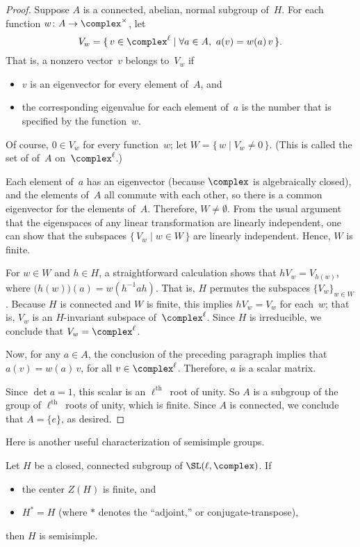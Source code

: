 \begin{proof}
 Suppose $A$ is a connected, abelian, normal subgroup
of~$H$. For each function $w \colon A \to \complex^\times$,
let 
 $$ V_w = \{\, v \in \complex^\ell \mid \forall a \in A, \
a(v) = w(a) \, v \,\} .$$
 That is, a nonzero vector~$v$ belongs to~$V_w$ if 
 \begin{itemize}
 \item $v$ is an eigenvector for every element of~$A$, and 
 \item the corresponding eigenvalue for each element of~$a$
is the number that is specified by the function~$w$.
 \end{itemize}
 Of course, $0 \in V_w$ for every function~$w$; let $W =
\{\, w \mid V_w \neq 0\,\}$. (This is called the set of
 of~$A$
on~$\complex^\ell$.)

Each element of~$a$ has an eigenvector (because $\complex$
is algebraically closed), and the elements of~$A$ all
commute with each other, so there is a common eigenvector
for the elements of~$A$. Therefore, $W \neq \emptyset$. From
the usual argument that the eigenspaces of any linear
transformation are linearly independent, one can show that
the subspaces $\{\,V_w \mid w \in W \,\}$ are linearly
independent. Hence, $W$ is finite.

For $w \in W$ and $h \in H$, a straightforward calculation
shows that 
 $h V_w = V_{h(w)}$, where  $\bigl( h(w) \bigr) (a) =
w(h^{-1} a h)$. That is, $H$ permutes the subspaces
$\{V_w\}_{w \in W}$. Because $H$ is connected and $W$ is
finite, this implies $h V_w = V_w$ for each~$w$; that is,
$V_w$ is an $H$-invariant subspace of~$\complex^\ell$. Since
$H$ is irreducible, we conclude that $V_w = \complex^\ell$.

Now, for any $a \in A$, the conclusion of the preceding
paragraph implies that $a(v) = w(a)\, v$, for all $v \in
\complex^\ell$. Therefore, $a$ is a scalar matrix. 

Since $\det a = 1$, this scalar is an
$\ell^{\text{th}}$~root of unity. So $A$ is a subgroup of
the group of $\ell^{\text{th}}$~roots of unity, which is
finite. Since $A$ is connected, we conclude that $A =
\{e\}$, as desired.
 \end{proof}

Here is another useful characterization of semisimple
groups.

\begin{cor} \label{SelfAdj->SS}
 Let $H$ be a closed, connected subgroup of\/
$\SL(\ell,\complex)$. If
 \begin{itemize} 
 \item the center $Z(H)$ is finite, and
 \item $H^* = H$ \textup(where $*$ denotes the ``adjoint\zz,''
or conjugate-transpose\textup),
 \end{itemize}
 then $H$ is semisimple.
 \end{cor}

